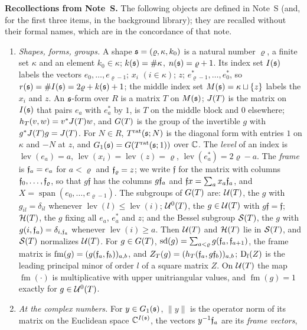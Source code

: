 \documentclass[11pt,a4paper]{article}
\newcommand{\subhead}[1]{\par\addvspace{9pt plus 2pt}\Needspace{4\baselineskip}\noindent\textbf{#1}\enspace\ignorespaces}
\theoremstyle{plainx}
\theoremstyle{uprightx}
\newcommand{\fm}[1]{\operatorname{fm}(#1)}                 %
\newcommand{\spanE}{\operatorname{span}}
\newcommand{\lev}{\operatorname{lev}}
\begin{document}
\subhead{Recollections from Note~S.} The following objects are defined in Note~S (and, for the first three
items, in the background library); they are recalled without their formal names, which are in the concordance of
that note.
\begin{enumerate}[label=(R\arabic*),leftmargin=3.1em,itemsep=3pt]
\item\label{r:space} \emph{Shapes, forms, groups.} A shape $\mathfrak{s}=(\varrho,\kappa,k_0)$ is a natural number
$\varrho$, a finite set $\kappa$ and an element $k_0\in\kappa$; $k(\mathfrak{s})=\#\kappa$, $n(\mathfrak{s})=\varrho+1$. Its
index set $I(\mathfrak{s})$ labels the vectors $e_0,\dots,e_{\varrho-1}$; $x_i$ $(i\in\kappa)$; $z$;
$e^*_{\varrho-1},\dots,e^*_0$, so $r(\mathfrak{s})=\#I(\mathfrak{s})=2\varrho+k(\mathfrak{s})+1$; the middle index set
$M(\mathfrak{s})=\kappa\sqcup\{z\}$ labels the $x_i$ and $z$. An $\mathfrak{s}$-form over $R$ is a matrix $T$ on $M(\mathfrak{s})$; $J(T)$
is the matrix on $I(\mathfrak{s})$ that pairs $e_a$ with $e^*_a$ by $1$, is $T$ on the middle block and $0$ elsewhere;
$h_T(v,w)=v^{*}J(T)w$, and $G(T)$ is the group of the invertible $g$ with $g^{*}J(T)g=J(T)$. For $N\in R$,
$T^{\mathrm{rat}}(\mathfrak{s};N)$ is the diagonal form with entries $1$ on $\kappa$ and $-N$ at $z$, and
$G_{1}(\mathfrak{s})=G(T^{\mathrm{rat}}(\mathfrak{s};1))$ over $\mathbb{C}$. The \emph{level} of an index is $\lev(e_a)=a$, $\lev(x_i)=\lev(z)=\varrho$,
$\lev(e^*_a)=2\varrho-a$. The \emph{frame} is $\mathfrak{f}_{a}=e_a$ for $a<\varrho$ and $\mathfrak{f}_{\varrho}=z$; we write $\mathfrak f$ for
the matrix with columns $\mathfrak{f}_{0},\dots,\mathfrak{f}_{\varrho}$, so that $g\mathfrak f$ has the columns $g\mathfrak{f}_{a}$ and
$\mathfrak f x=\sum_a x_a\mathfrak{f}_{a}$, and $X=\spanE(e_0,\dots,e_{\varrho-1})$. The subgroups of $G(T)$ are: $\mathcal{U}(T)$,
the $g$ with $g_{il}=\delta_{il}$ whenever $\lev(l)\le\lev(i)$; $\mathcal{U}^{0}(T)$, the $g\in\mathcal{U}(T)$ with
$g\mathfrak f=\mathfrak f$; $\mathcal{H}(T)$, the $g$ fixing all $e_a$, $e^*_a$ and $z$; and the Bessel subgroup $\mathcal{S}(T)$,
the $g$ with $g(i,\mathfrak{f}_{a})=\delta_{i,\mathfrak{f}_{a}}$ whenever $\lev(i)\ge a$. Then $\mathcal{U}(T)$ and $\mathcal{H}(T)$ lie in $\mathcal{S}(T)$, and
$\mathcal{S}(T)$ normalizes $\mathcal{U}(T)$. For $g\in G(T)$, $\operatorname{sd}(g)=\sum_{a<\varrho}g(\mathfrak{f}_{a},\mathfrak{f}_{a+1})$, the frame matrix is
$\fm{g}=(g(\fr{a},\fr{b}))_{a,b}$, and $Z_{T}(g)=(h_T(\mathfrak{f}_{a},g\mathfrak{f}_{b}))_{a,b}$; $\mathrm{D}_{l}(Z)$ is the leading
principal minor of order $l$ of a square matrix $Z$. On $\mathcal{U}(T)$ the map $\fm{\cdot}$ is multiplicative with
upper unitriangular values, and $\fm{g}=1$ exactly for $g\in\mathcal{U}^{0}(T)$.
\item\label{r:real} \emph{At the complex numbers.} For $y\in G_{1}(\mathfrak{s})$, $\|y\|$ is the operator norm of its
matrix on the Euclidean space $\mathbb{C}^{I(\mathfrak{s})}$, the vectors $y^{-1}\mathfrak{f}_{a}$ are its \emph{frame vectors},

\end{enumerate}
\end{document}
